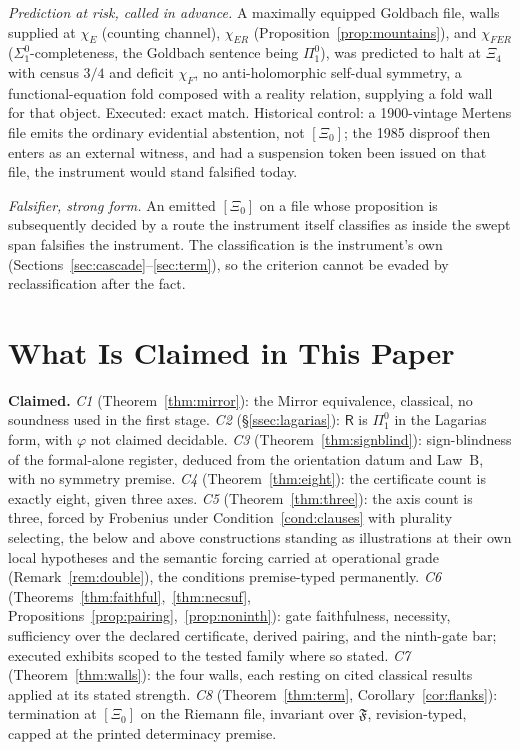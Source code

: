 \documentclass[twocolumn,10pt]{article}
\theoremstyle{plain}
\theoremstyle{definition}
\newcommand{\tXi}{[\Xi_0]}
\newcommand{\R}{\mathsf{R}}
\newcommand{\Fr}{\mathfrak{F}}
\begin{document}
\emph{Prediction at risk, called in advance.} A maximally equipped Goldbach file, walls supplied at $\chi_E$ (counting channel), $\chi_{ER}$ (Proposition~\ref{prop:mountains}), and $\chi_{FER}$ ($\Sigma^0_1$-completeness, the Goldbach sentence being $\Pi^0_1$), was predicted to halt at $\Xi_4$ with census $3/4$ and deficit $\chi_F$, no anti-holomorphic self-dual symmetry, a functional-equation fold composed with a reality relation, supplying a fold wall for that object. Executed: exact match. Historical control: a 1900-vintage Mertens file emits the ordinary evidential abstention, not $\tXi$; the 1985 disproof \cite{OdlyzkoteRiele1985} then enters as an external witness, and had a suspension token been issued on that file, the instrument would stand falsified today.

\emph{Falsifier, strong form.} An emitted $\tXi$ on a file whose proposition is subsequently decided by a route the instrument itself classifies as inside the swept span falsifies the instrument. The classification is the instrument's own (Sections~\ref{sec:cascade}--\ref{sec:term}), so the criterion cannot be evaded by reclassification after the fact.

\section{What Is Claimed in This Paper}\label{sec:claims}
\noindent\textbf{Claimed.}
\emph{C1} (Theorem~\ref{thm:mirror}): the Mirror equivalence, classical, no soundness used in the first stage. 
\emph{C2} (\S\ref{ssec:lagarias}): $\R$ is $\Pi^0_1$ in the Lagarias form, with $\varphi$ not claimed decidable. 
\emph{C3} (Theorem~\ref{thm:signblind}): sign-blindness of the formal-alone register, deduced from the orientation datum and Law~B, with no symmetry premise. 
\emph{C4} (Theorem~\ref{thm:eight}): the certificate count is exactly eight, given three axes. 
\emph{C5} (Theorem~\ref{thm:three}): the axis count is three, forced by Frobenius under Condition~\ref{cond:clauses} with plurality selecting, the below and above constructions standing as illustrations at their own local hypotheses and the semantic forcing carried at operational grade (Remark~\ref{rem:double}), the conditions premise-typed permanently. 
\emph{C6} (Theorems~\ref{thm:faithful},~\ref{thm:necsuf}, Propositions~\ref{prop:pairing},~\ref{prop:noninth}): gate faithfulness, necessity, sufficiency over the declared certificate, derived pairing, and the ninth-gate bar; executed exhibits scoped to the tested family where so stated. 
\emph{C7} (Theorem~\ref{thm:walls}): the four walls, each resting on cited classical results applied at its stated strength. 
\emph{C8} (Theorem~\ref{thm:term}, Corollary~\ref{cor:flanks}): termination at $\tXi$ on the Riemann file, invariant over $\Fr$, revision-typed, capped at the printed determinacy premise.
\end{document}
